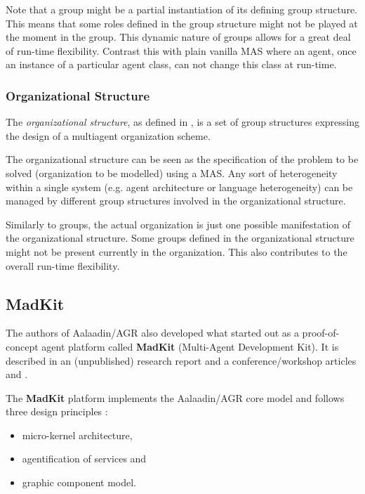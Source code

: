 Note that a group might be a partial instantiation of its defining group structure.
This means that some roles defined in the group structure might not be played at the moment in the group.
This dynamic nature of groups allows for a great deal of run-time flexibility.
Contrast this with plain vanilla MAS where an agent, once an instance of a particular agent class, can not change this class at run-time.

\subsubsection*{Organizational Structure}

The \textit{organizational structure}, as defined in \cite{Ferber97}, is a set of group structures expressing the design of a multiagent organization scheme.

The organizational structure can be seen as the specification of the problem to be solved (organization to be modelled) using a MAS.
Any sort of heterogeneity within a single system (e.g. agent architecture or language heterogeneity) can be managed by different group structures involved in the organizational structure.

Similarly to groups, the actual organization is just one possible manifestation of the organizational structure.
Some groups defined in the organizational structure might not be present currently in the organization.
This also contributes to the overall run-time flexibility.

\subsection{MadKit}

The authors of Aalaadin/AGR also developed what started out as a proof-of-concept agent platform called \textbf{MadKit} (Multi-Agent Development Kit).
It is described in an (unpublished) research report \cite{Ferber97} and a conference/workshop articles \cite{Ferber98} and \cite{Gutknecht00}.

The \textbf{MadKit} platform implements the Aalaadin/AGR core model and follows three design principles \cite{Ferber97}:
\begin{itemize}
	\item micro-kernel architecture,
	\item agentification of services and
	\item graphic component model.
\end{itemize}

